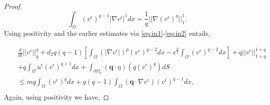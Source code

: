 \documentclass[10pt,a4paper]{amsart}
\begin{document}
\begin{proof}
\begin{equation}
\int_{\Omega} (v^{\epsilon})^{q-1}|\nabla v^{\epsilon}|^{1}dx = \frac{1}{q}||\nabla (v^{\epsilon})^{q}||^{1}_{1}.
\end{equation}
%
Using positivity and the earlier estimates via \eqref{eq:in1}-\eqref{eq:in2} entails,




\begin{eqnarray}
&& \frac{d}{dt}||v^{\epsilon}||^{q}_{q}  + d_{2}  q(q-1)[\int_{\Omega} \left(
|\nabla v^{\epsilon}|\right)^{p}(v^{\epsilon})^{q-2} dx - \epsilon^{\frac{p}{2}}\int_{\Omega} (v^{\epsilon})^{q-2} dx]
+q||v^{\epsilon}||^{1+q}_{1+q} \nonumber \\
&& + q\int_{\Omega}  u^{\epsilon}(v^{\epsilon})^{q+1}dx 
+\int_{\partial \Omega_{2}} (\textbf{q}  \cdot \eta) (q(v^{\epsilon})^{q}) dS 
 \nonumber \\
&& 
\leq mq\int_{\Omega} (v^{\epsilon})^{q}dx + q(q-1)\int_{\Omega} (\textbf{q}\cdot \nabla v^{\epsilon}) (v^{\epsilon})^{q-1}dx.\nonumber \\
\end{eqnarray}
%
Again, using positivity we have,


\end{proof}
\end{document}
